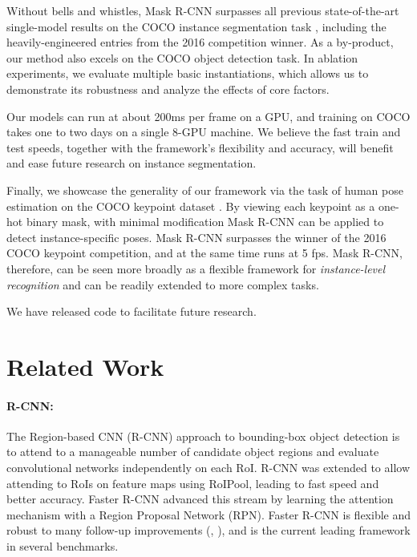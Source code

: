 \documentclass[10pt,twocolumn,letterpaper]{article}
\begin{document}
Without bells and whistles, Mask R-CNN surpasses all previous state-of-the-art single-model results on the COCO instance segmentation task \cite{Lin2014}, including the heavily-engineered entries from the 2016 competition winner. As a by-product, our method also excels on the COCO object detection task. In ablation experiments, we evaluate multiple basic instantiations, which allows us to demonstrate its robustness and analyze the effects of core factors.

Our models can run at about 200ms per frame on a GPU, and training on COCO takes one to two days on a single 8-GPU machine. We believe the fast train and test speeds, together with the framework's flexibility and accuracy, will benefit and ease future research on instance segmentation.

Finally, we showcase the generality of our framework via the task of human pose estimation on the COCO keypoint dataset \cite{Lin2014}. By viewing each keypoint as a one-hot binary mask, with minimal modification Mask R-CNN can be applied to detect instance-specific poses. Mask R-CNN surpasses the winner of the 2016 COCO keypoint competition, and at the same time runs at 5 fps. Mask R-CNN, therefore, can be seen more broadly as a flexible framework for \emph{instance-level recognition} and can be readily extended to more complex tasks.

We have released code to facilitate future research.

\section{Related Work}

\paragraph{R-CNN:} The Region-based CNN (R-CNN) approach \cite{Girshick2014} to bounding-box object detection is to attend to a manageable number of candidate object regions \cite{Uijlings2013, Hosang2015} and evaluate convolutional networks  \cite{LeCun1989,Krizhevsky2012} independently on each RoI. R-CNN was extended \cite{He2014, Girshick2015a} to allow attending to RoIs on feature maps using RoIPool, leading to fast speed and better accuracy. Faster R-CNN \cite{Ren2015a} advanced this stream by learning the attention mechanism with a Region Proposal Network (RPN). Faster R-CNN is flexible and robust to many follow-up improvements (\eg, \cite{Shrivastava2016, Lin2017, Huang2017}), and is the current leading framework in several benchmarks.
\end{document}
